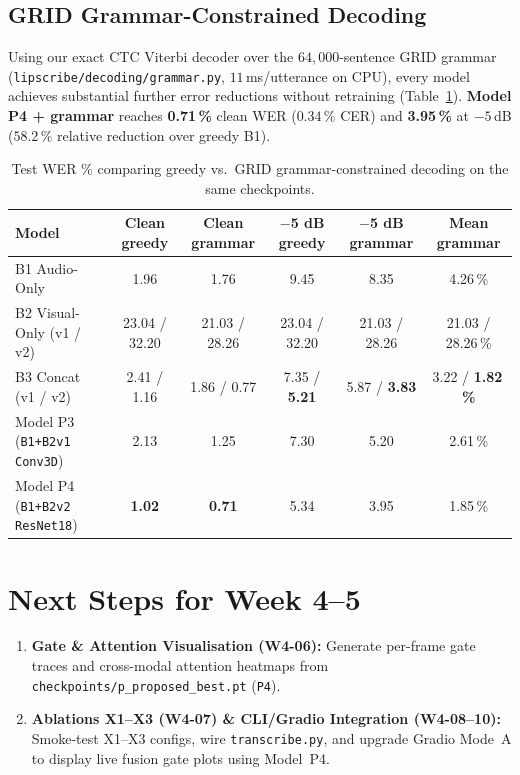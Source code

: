 \documentclass[11pt,a4paper]{article}
\newcommand{\code}[1]{\texttt{\small #1}}
\begin{document}
\subsection{GRID Grammar-Constrained Decoding}
\label{sec:grammar}
Using our exact CTC Viterbi decoder over the $64{,}000$-sentence GRID grammar (\code{lipscribe/decoding/grammar.py}, $11$\,ms/utterance on CPU), every model achieves substantial further error reductions without retraining (Table~\ref{tab:grammar}). \textbf{Model P4 + grammar} reaches \textbf{0.71\,\%} clean WER ($0.34\,\%$ CER) and \textbf{3.95\,\%} at $-5$\,dB ($58.2\,\%$ relative reduction over greedy B1).

\begin{table}[htbp]
\centering\small
\caption{Test WER \% comparing greedy vs.\ GRID grammar-constrained decoding on the same checkpoints.}
\label{tab:grammar}
\begin{tabularx}{\textwidth}{@{}Xccccc@{}}
\toprule
\rowcolor{white}\sffamily\bfseries Model & \textbf{Clean greedy} & \textbf{Clean grammar} & \textbf{$-$5 dB greedy} & \textbf{$-$5 dB grammar} & \textbf{Mean grammar} \\
\midrule
B1 Audio-Only & 1.96 & 1.76 & 9.45 & 8.35 & 4.26\,\% \\
B2 Visual-Only (v1 / v2) & 23.04 / 32.20 & 21.03 / 28.26 & 23.04 / 32.20 & 21.03 / 28.26 & 21.03 / 28.26\,\% \\
B3 Concat (v1 / v2) & 2.41 / 1.16 & 1.86 / 0.77 & 7.35 / \textbf{5.21} & 5.87 / \textbf{3.83} & 3.22 / \textbf{1.82\,\%} \\
Model P3 (\code{B1+B2v1 Conv3D}) & 2.13 & 1.25 & 7.30 & 5.20 & 2.61\,\% \\
Model P4 (\code{B1+B2v2 ResNet18}) & \textbf{1.02} & \textbf{0.71} & 5.34 & 3.95 & 1.85\,\% \\
\bottomrule
\end{tabularx}
\end{table}

\section{Next Steps for Week 4--5}
\begin{enumerate}
  \item \textbf{Gate \& Attention Visualisation (W4-06):} Generate per-frame gate traces and cross-modal attention heatmaps from \code{checkpoints/p\_proposed\_best.pt} (\code{P4}).
  \item \textbf{Ablations X1--X3 (W4-07) \& CLI/Gradio Integration (W4-08--10):} Smoke-test X1--X3 configs, wire \code{transcribe.py}, and upgrade Gradio Mode~A to display live fusion gate plots using Model~P4.
\end{enumerate}
\end{document}
